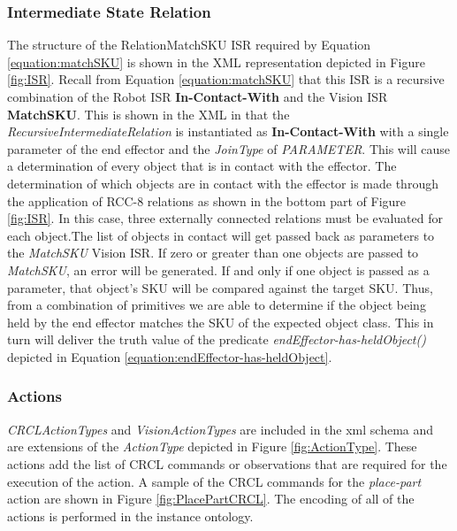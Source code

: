 \subsubsection{Intermediate State Relation}
The structure of the RelationMatchSKU ISR required by Equation \ref{equation:matchSKU} is shown in the XML
representation
depicted in Figure \ref{fig:ISR}. 
Recall from Equation \ref{equation:matchSKU} that this ISR is 
a recursive combination of the Robot ISR \textbf{In-Contact-With} and
the Vision ISR \textbf{MatchSKU}. This is shown in the XML in that
the \textit{RecursiveIntermediateRelation} is instantiated as
\textbf{In-Contact-With} with a single parameter of the end effector
and the \textit{JoinType} of \textit{PARAMETER}. This will cause a determination
of every object that is in contact with the effector. The 
determination of which objects are in contact with the effector
is made through the application of RCC-8 relations as shown in
the bottom part of Figure \ref{fig:ISR}. In this case, three
externally connected relations must be evaluated for each
object.The list of objects in contact
will get passed back as parameters to the \textit{MatchSKU} Vision ISR.
If zero or greater than one objects are passed to \textit{MatchSKU},
an error will be generated. If and only if one object is passed as
a parameter, that object's SKU will be compared against the target
SKU. Thus, from a combination of primitives we are able to determine
if the object being held by the end effector matches the SKU of the
expected object class. This in turn will deliver the truth value
of the predicate \textit{endEffector-has-heldObject()} depicted
in Equation \ref{equation:endEffector-has-heldObject}.  
\subsubsection{Actions}
\textit{CRCLActionTypes} and \textit{VisionActionTypes} are included
in the xml schema and are extensions of the \textit{ActionType} depicted
in Figure \ref{fig:ActionType}. These actions add the list of CRCL commands or observations that are required for the execution of the action. A sample of the CRCL commands for the \textit{place-part} action
are shown in Figure \ref{fig:PlacePartCRCL}. The encoding of all of the
actions is performed in the instance ontology.
